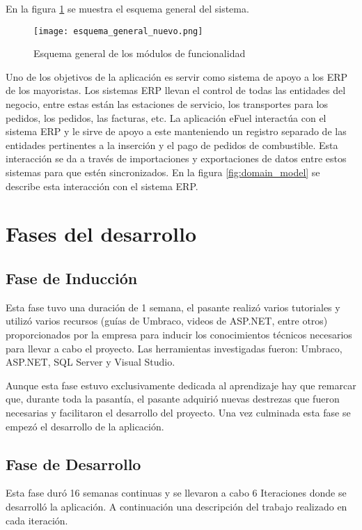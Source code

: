 En la figura \ref{fig:esquema_general_nuevo} se muestra el esquema general del sistema.

\begin{figure}[ht]
    \texttt{[image: esquema\_general\_nuevo.png]}
    \caption{Esquema general de los módulos de funcionalidad}
    \label{fig:esquema_general_nuevo}
    \centering
\end{figure}

Uno de los objetivos de la aplicación es servir como sistema de apoyo a los ERP de los mayoristas. Los sistemas ERP llevan el control de todas las entidades del negocio, entre estas están las estaciones de servicio, los transportes para los pedidos, los pedidos, las facturas, etc. La aplicación eFuel interactúa con el sistema ERP y le sirve de apoyo a este manteniendo un registro separado de las entidades pertinentes a la inserción y el pago de pedidos de combustible. Esta interacción se da a través de importaciones y exportaciones de datos entre estos sistemas para que estén sincronizados. En la figura \ref{fig:domain_model} se describe esta interacción con el sistema ERP.

\section{Fases del desarrollo}
\subsection{Fase de Inducción}
Esta fase tuvo una duración de 1 semana, el pasante realizó varios tutoriales y utilizó varios recursos (guías de Umbraco, videos de ASP.NET, entre otros) proporcionados por la empresa para inducir los conocimientos técnicos necesarios para llevar a cabo el proyecto. Las herramientas investigadas fueron: Umbraco, ASP.NET, SQL Server y Visual Studio.

Aunque esta fase estuvo exclusivamente dedicada al aprendizaje hay que remarcar que, durante toda la pasantía, el pasante adquirió nuevas destrezas que fueron necesarias y facilitaron el desarrollo del proyecto. Una vez culminada esta fase se empezó el desarrollo de la aplicación.


\subsection{Fase de Desarrollo}
Esta fase duró 16 semanas continuas y se llevaron a cabo 6 Iteraciones donde se desarrolló la aplicación. A continuación una descripción del trabajo realizado en cada iteración.

